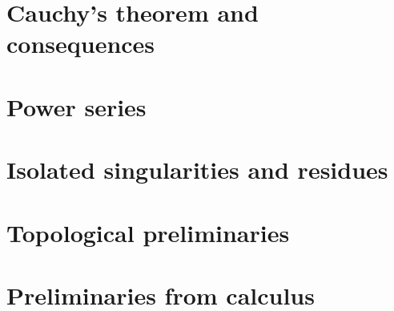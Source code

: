 \chapter{Cauchy's theorem and consequences}



\chapter{Power series}


\chapter{Isolated singularities and residues}


\appendix

\chapter{Topological preliminaries}


\chapter{Preliminaries from calculus}

